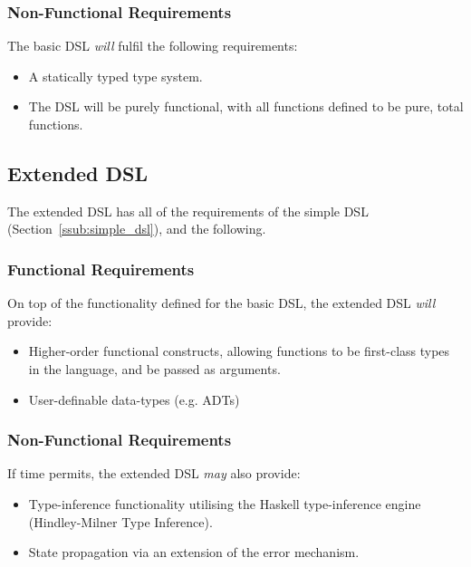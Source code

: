 \documentclass[a4paper,11pt]{report}
\begin{document}

\subsubsection{Non-Functional Requirements} %
\label{ssub:non_functional_requirements_simple}
The basic DSL \textit{will} fulfil the following requirements:
\begin{itemize}
    \item A statically typed type system.
    \item The DSL will be purely functional, with all functions defined to be pure, total functions.
\end{itemize}



\subsection{Extended DSL} %
\label{sub:extended_dsl}
The extended DSL has all of the requirements of the simple DSL (Section~\ref{ssub:simple_dsl}), and the following.

\subsubsection{Functional Requirements} %
\label{ssub:functional_requirements_extended}
On top of the functionality defined for the basic DSL, the extended DSL \textit{will} provide:
\begin{itemize}
    \item Higher-order functional constructs, allowing functions to be first-class types in the language, and be passed as arguments.
    \item User-definable data-types (e.g. ADTs)
\end{itemize}


\subsubsection{Non-Functional Requirements} %
\label{ssub:non_functional_requirements_extended}
If time permits, the extended DSL \textit{may} also provide:
\begin{itemize}
    \item Type-inference functionality utilising the Haskell type-inference engine (Hindley-Milner Type Inference).
    \item State propagation via an extension of the error mechanism.
\end{itemize}
\end{document}
